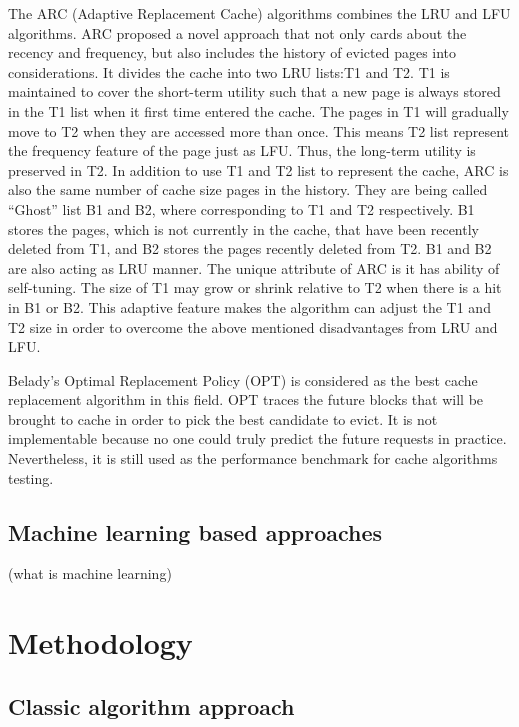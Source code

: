 \documentclass[letterpaper,twocolumn,10pt]{article}
\begin{document}
The ARC (Adaptive Replacement Cache) algorithms combines the LRU and LFU algorithms. ARC proposed a novel approach that not only cards about the recency and frequency, but also includes the history of evicted pages into considerations. It divides the cache into two LRU lists:T1 and T2. T1 is maintained to cover the short-term utility such that a new page is always stored in the T1 list when it first time entered the cache. The pages in T1 will gradually move to T2 when they are accessed more than once. This means T2 list represent the frequency feature of the page just as LFU. Thus, the long-term utility is preserved in T2. In addition to use T1 and T2 list to represent the cache, ARC is also the same number of cache size pages in the history. They are being called “Ghost” list B1 and B2, where corresponding to T1 and T2 respectively. B1 stores the pages, which is not currently in the cache, that have been recently deleted from T1, and B2 stores the pages recently deleted from T2. B1 and B2 are also acting as LRU manner. The unique attribute of ARC is it has ability of self-tuning. The size of T1 may grow or shrink relative to T2 when there is a hit in B1 or B2. This adaptive feature makes the algorithm can adjust the T1 and T2 size in order to overcome the above mentioned disadvantages from LRU and LFU.

Belady’s Optimal Replacement Policy (OPT) is considered as the best cache replacement algorithm in this field. OPT traces the future blocks that will be brought to cache in order to pick the best candidate to evict. It is not implementable because no one could truly predict the future requests in practice. Nevertheless, it is still used as the performance benchmark for cache algorithms testing. 

\subsection{Machine learning based approaches}

(what is machine learning)




\section{Methodology}

\subsection{Classic algorithm approach}
\end{document}
